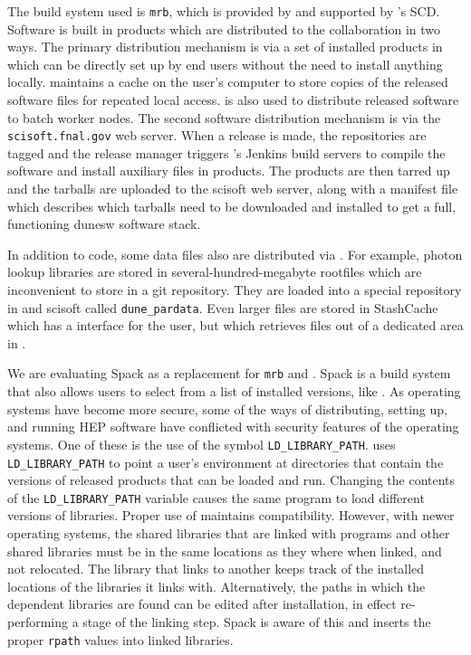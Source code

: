 \documentclass[../main-v1.tex]{subfiles}
\begin{document}
The build system used is {\tt mrb}, which is provided by and supported by 's SCD.  Software is built in  products which are distributed to the collaboration in two ways.  The primary distribution mechanism is via a set of installed products in  which can be directly set up by end users without the need to install anything locally.   maintains a cache on the user's computer to store copies of the released software files for repeated local access.   is also used to distribute released software to batch worker nodes.  The second software distribution mechanism is via the {\tt scisoft.fnal.gov} web server.  When a release is made, the repositories are tagged and the release manager triggers 's Jenkins build servers to compile the software and install auxiliary files in  products.  The  products are then tarred up and the tarballs are uploaded to the scisoft web server, along with a manifest file which describes which tarballs need to be downloaded and installed to get a full, %
functioning dunesw software stack.

In addition to code, some data files also are distributed via .  For example, photon lookup libraries are stored in several-hundred-megabyte rootfiles which are inconvenient to store in a git repository.  They are loaded into a special repository in  and scisoft called {\tt dune\_pardata}.  Even larger files are stored in StashCache which has a  interface for the user, but which retrieves files out of a dedicated area in .

We are evaluating Spack as a replacement for {\tt mrb} and .  Spack is a build system that also allows users to select from a list of installed versions, like .  As operating systems have become more secure, some of the ways of distributing, setting up, and running HEP software have conflicted with security features of the operating systems.  One of these is the use of the symbol {\tt LD\_LIBRARY\_PATH}.   uses {\tt LD\_LIBRARY\_PATH} to point a user's environment at directories that contain the versions of released products that can be loaded and run.  Changing the contents of the {\tt LD\_LIBRARY\_PATH} variable causes the same program to load different versions of libraries.  Proper use of  maintains compatibility.  However, with newer operating systems, the shared libraries that are linked with programs and other shared libraries must be in the same locations as they where when linked, and not relocated.  The library that links to another keeps track of the installed locations of the libraries it links with.  Alternatively, the paths in which the dependent libraries are found can be edited after installation, in effect re-performing a stage of the linking step.  Spack is aware of this and inserts the proper {\tt rpath} values into linked libraries.
\end{document}

